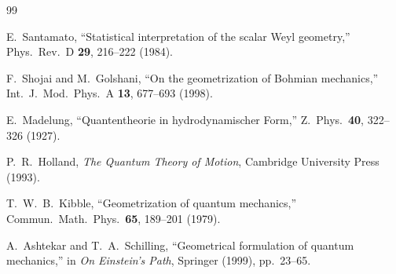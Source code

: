 \documentclass[11pt]{article}
\begin{document}
\begin{thebibliography}{99}

E.~Santamato,
``Statistical interpretation of the scalar Weyl geometry,''
Phys.\ Rev.\ D \textbf{29}, 216--222 (1984).

F.~Shojai and M.~Golshani,
``On the geometrization of Bohmian mechanics,''
Int.\ J.\ Mod.\ Phys.\ A \textbf{13}, 677--693 (1998).

E.~Madelung,
``Quantentheorie in hydrodynamischer Form,''
Z.\ Phys.\ \textbf{40}, 322--326 (1927).

P.~R.~Holland,
\emph{The Quantum Theory of Motion},
Cambridge University Press (1993).

T.~W.~B.~Kibble,
``Geometrization of quantum mechanics,''
Commun.\ Math.\ Phys.\ \textbf{65}, 189--201 (1979).

A.~Ashtekar and T.~A.~Schilling,
``Geometrical formulation of quantum mechanics,''
in \emph{On Einstein’s Path},
Springer (1999), pp.~23--65.

\end{thebibliography}
\end{document}

